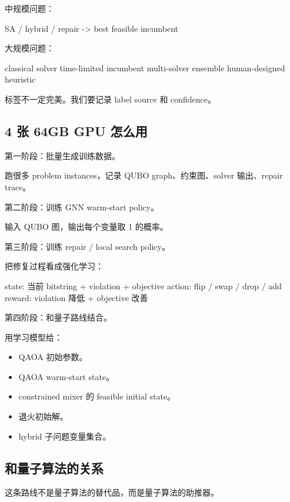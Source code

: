 \documentclass[UTF8,12pt,a4paper]{ctexart}
\begin{document}
中规模问题：

\begin{GuideVerbatim}
SA / hybrid / repair -> best feasible incumbent
\end{GuideVerbatim}

大规模问题：

\begin{GuideVerbatim}
classical solver time-limited incumbent
multi-solver ensemble
human-designed heuristic
\end{GuideVerbatim}

标签不一定完美。我们要记录 label source 和 confidence。

\subsection*{4 张 64GB GPU 怎么用}

第一阶段：批量生成训练数据。

跑很多 problem instances，记录 QUBO graph、约束图、solver 输出、repair trace。

第二阶段：训练 GNN warm-start policy。

输入 QUBO 图，输出每个变量取 1 的概率。

第三阶段：训练 repair / local search policy。

把修复过程看成强化学习：

\begin{GuideVerbatim}
state: 当前 bitstring + violation + objective
action: flip / swap / drop / add
reward: violation 降低 + objective 改善
\end{GuideVerbatim}

第四阶段：和量子路线结合。

用学习模型给：

\begin{itemize}
\item QAOA 初始参数。
\item QAOA warm-start state。
\item constrained mixer 的 feasible initial state。
\item 退火初始解。
\item hybrid 子问题变量集合。
\end{itemize}

\subsection*{和量子算法的关系}

这条路线不是量子算法的替代品，而是量子算法的助推器。
\end{document}
